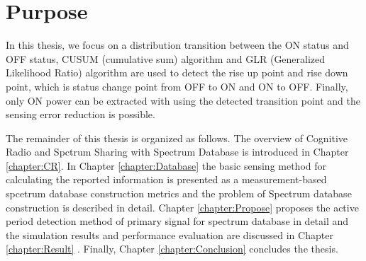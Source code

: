 \section{Purpose}
In this thesis, we focus on a distribution transition between the ON status and OFF status, CUSUM (cumulative sum) algorithm \cite{ref:CUSUM} and GLR (Generalized Likelihood Ratio) algorithm \cite{ref:GLR} are used to detect the rise up point and rise down point, which is status change point from OFF to ON and ON to OFF. Finally, only ON power can be extracted with using the detected transition point and the sensing error reduction is possible. 

The remainder of this thesis is organized as follows. The overview of Cognitive Radio and Spctrum Sharing with Spectrum Database is introduced in Chapter \ref{chapter:CR}. In Chapter \ref{chapter:Database} the basic sensing method for calculating the reported information is presented as a measurement-based spcetrum database construction metrics and the problem of Spectrum database construction is described in detail. Chapter \ref{chapter:Propose} proposes the active period detection method of primary signal for spectrum database in detail and the simulation results and performance evaluation are discussed in Chapter \ref{chapter:Result} . Finally, Chapter \ref{chapter:Conclusion} concludes the thesis.


